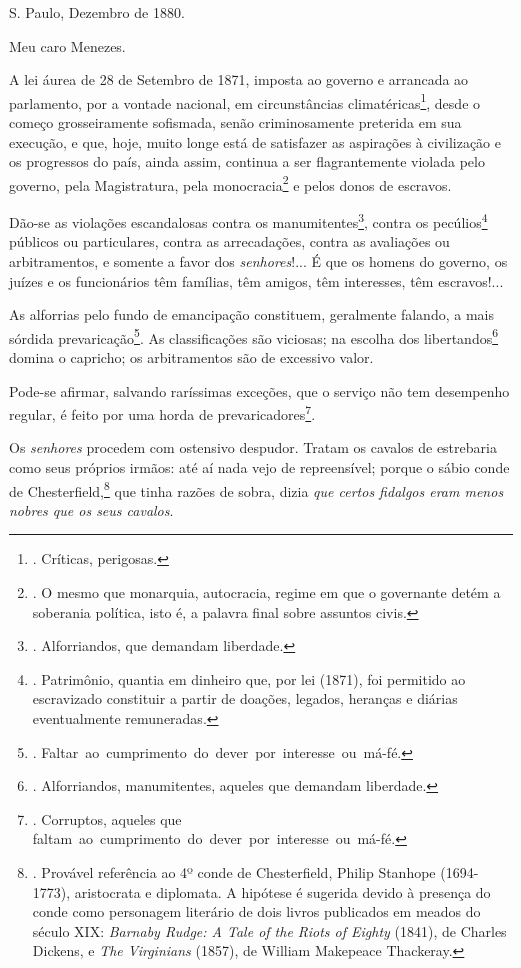 S. Paulo, Dezembro de 1880.

Meu caro Menezes.

A lei áurea de 28 de Setembro de 1871, imposta ao governo e arrancada ao
parlamento, por a vontade nacional, em circunstâncias
climatéricas\footnote{. Críticas, perigosas.}, desde o começo
grosseiramente sofismada, senão criminosamente preterida em sua
execução, e que, hoje, muito longe está de satisfazer as aspirações à
civilização e os progressos do país, ainda assim, continua a ser
flagrantemente violada pelo governo, pela Magistratura, pela
monocracia\footnote{. O mesmo que monarquia, autocracia, regime em que o
  governante detém a soberania política, isto é, a palavra final sobre
  assuntos civis.} e pelos donos de escravos.

Dão-se as violações escandalosas contra os manumitentes\footnote{.
  Alforriandos, que demandam liberdade.}, contra os pecúlios\footnote{.
  Patrimônio, quantia em dinheiro que, por lei (1871), foi permitido ao
  escravizado constituir a partir de doações, legados, heranças e
  diárias eventualmente remuneradas.} públicos ou particulares, contra
as arrecadações, contra as avaliações ou arbitramentos, e somente a
favor dos \emph{senhores}!... É que os homens do governo, os juízes e os
funcionários têm famílias, têm amigos, têm interesses, têm escravos!...

As alforrias pelo fundo de emancipação constituem, geralmente falando, a
mais sórdida prevaricação\footnote{.
  Faltar~ao~cumprimento~do~dever~por~interesse~ou~má-fé.}. As
classificações são viciosas; na escolha dos libertandos\footnote{.
  Alforriandos, manumitentes, aqueles que demandam liberdade.} domina o
capricho; os arbitramentos são de excessivo valor.

Pode-se afirmar, salvando raríssimas exceções, que o serviço não tem
desempenho regular, é feito por uma horda de prevaricadores\footnote{.
  Corruptos, aqueles que
  faltam~ao~cumprimento~do~dever~por~interesse~ou~má-fé.}.

Os \emph{senhores} procedem com ostensivo despudor. Tratam os cavalos de
estrebaria como seus próprios irmãos: até aí nada vejo de repreensível;
porque o sábio conde de Chesterfield,\footnote{. Provável referência ao
  4º conde de Chesterfield, Philip Stanhope (1694-1773), aristocrata e
  diplomata. A hipótese é sugerida devido à presença do conde como
  personagem literário de dois livros publicados em meados do século
  XIX: \emph{Barnaby Rudge: A Tale of the Riots of Eighty} (1841), de
  Charles Dickens, e \emph{The Virginians} (1857), de William Makepeace
  Thackeray.} que tinha razões de sobra, dizia \emph{que certos fidalgos
eram menos nobres que os seus cavalos}.

